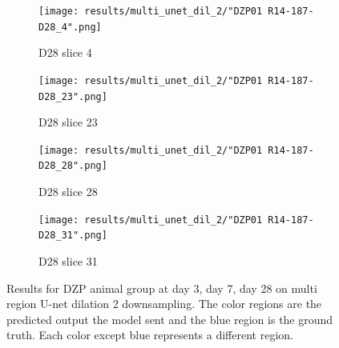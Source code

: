 \begin{figure}[!htb]
\medskip
\begin{subfigure}{0.25\textwidth}
  \texttt{[image: results/multi\_unet\_dil\_2/"DZP01 R14-187-D28\_4".png]}
  \caption{D28 slice 4}
\end{subfigure}\hfil %
\begin{subfigure}{0.25\textwidth}
  \texttt{[image: results/multi\_unet\_dil\_2/"DZP01 R14-187-D28\_23".png]}
  \caption{D28 slice 23}
\end{subfigure}\hfil %
\begin{subfigure}{0.25\textwidth}
  \texttt{[image: results/multi\_unet\_dil\_2/"DZP01 R14-187-D28\_28".png]}
  \caption{D28 slice 28}
\end{subfigure}\hfil %
\begin{subfigure}{0.25\textwidth}
  \texttt{[image: results/multi\_unet\_dil\_2/"DZP01 R14-187-D28\_31".png]}
  \caption{D28 slice 31}
\end{subfigure}
  
  \caption{Results for DZP animal group at day 3, day 7, day 28 on multi region U-net dilation 2 downsampling. The color regions are the predicted output the model sent and the blue region is the ground truth. Each color except blue represents a different region.}
  \label{fig:results_multi_unetdil2_DZP}
\end{figure}


